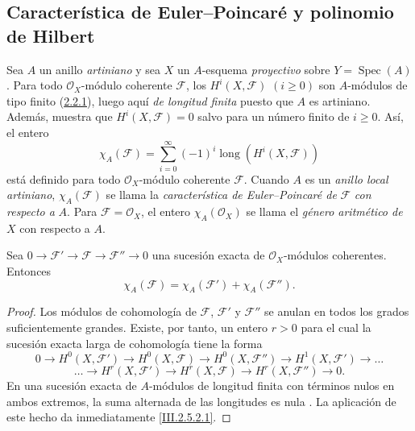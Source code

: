 \subsection{Característica de Euler--Poincar\'e y polinomio de Hilbert}
\label{subsection:III.2.5}
\label{subsection:III.2.5-fr}

\begin{env}[2.5.1]
\label{III.2.5.1}
\label{III.2.5.1-fr}
Sea $A$ un anillo \emph{artiniano} y sea $X$ un $A$-esquema \emph{proyectivo} sobre
$Y=\operatorname{Spec}(A)$.
Para todo $\mathcal O_X$-módulo coherente $\mathcal F$, los $H^i(X,\mathcal F)$ $(i\geq0)$ son $A$-módulos de
tipo finito (\hyperref[III.2.2.1-fr]{2.2.1}), luego aquí \emph{de longitud finita}
puesto que $A$ es artiniano.
Además,  muestra que $H^i(X,\mathcal F)=0$ salvo para un número finito de $i\geq0$.
Así, el entero
\[
\chi_A(\mathcal F)=\sum_{i=0}^{\infty}(-1)^i
\operatorname{long}(H^i(X,\mathcal F))
\tag{2.5.1.1}\label{III.2.5.1.1-fr}
\]
está definido para todo $\mathcal O_X$-módulo coherente $\mathcal F$.
Cuando $A$ es un \emph{anillo local artiniano}, $\chi_A(\mathcal F)$ se llama la \emph{característica de Euler--Poincar\'e de} $\mathcal F$ \emph{con respecto a} $A$.
Para $\mathcal F=\mathcal O_X$, el entero $\chi_A(\mathcal O_X)$ se llama el \emph{género aritmético de} $X$ con respecto a $A$.
\end{env}

\begin{proposition}[2.5.2]
\label{III.2.5.2}
\label{III.2.5.2-fr}
Sea
$0\longrightarrow\mathcal F'\longrightarrow\mathcal F
\longrightarrow\mathcal F''\longrightarrow0$
una sucesión exacta de $\mathcal O_X$-módulos coherentes.
Entonces
\[
\chi_A(\mathcal F)=\chi_A(\mathcal F')+\chi_A(\mathcal F'').
\tag{2.5.2.1}\label{III.2.5.2.1-fr}
\]
\end{proposition}

\begin{proof}
Los módulos de cohomología de $\mathcal F$, $\mathcal F'$ y $\mathcal F''$ se anulan en todos los grados suficientemente grandes.
Existe, por tanto, un entero $r>0$ para el cual la sucesión exacta larga de cohomología tiene la forma
\[
0\to H^0(X,\mathcal F')\to H^0(X,\mathcal F)
\to H^0(X,\mathcal F'')\to H^1(X,\mathcal F')\to\ldots
\]
\[
\ldots\to H^r(X,\mathcal F')\to H^r(X,\mathcal F)
\to H^r(X,\mathcal F'')\to0.
\]
En una sucesión exacta de $A$-módulos de longitud finita con términos nulos en ambos extremos, la suma alternada de las longitudes es nula .
La aplicación de este hecho da inmediatamente \eqref{III.2.5.2.1}.
\end{proof}

